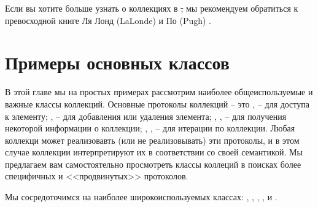 \documentclass[a4paper,10pt,twoside]{book}
\begin{document}
Если вы хотите больше узнать о коллекциях в \st, мы рекомендуем обратиться к превосходной книге Ля Лонд (LaLonde) и По (Pugh) \cite{LaLo90a}.

\section{Примеры основных классов}
В этой главе мы на простых примерах рассмотрим наиболее общеиспользуемые и важные классы коллекций.
Основные протоколы коллекций -- это ,  -- для доступа к элементу; ,  -- для добавления или удаления элемента; , ,  -- для получения некоторой информации о коллекции; , ,  -- для итерации по коллекции.
Любая коллекци может реализовавть (или не реализовывать) эти протоколы, и в этом случае коллекции интерпретируют их в соответствии со своей семантикой. Мы предлагаем вам самостоятельно просмотреть классы коллеций в поисках более специфичных и <<продвинутых>> протоколов.

Мы сосредоточимся на наиболее широкоиспользуемых классах: , , , ,  и .
\end{document}
